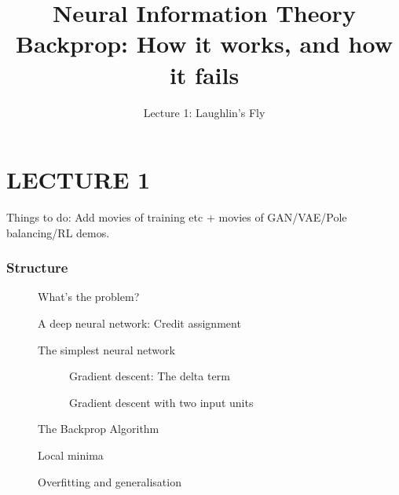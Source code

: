 \documentclass{beamer}
\title[{\em PSY6308}: Information Theory] 
{Neural Information Theory}
\subtitle{Lecture 1: Laughlin's Fly} %
\date{}
\begin{document}


\section{LECTURE 1} %

\title{%
Backprop: How it works, and how it fails}
\subtitle{} %
\setcounter{framenumber}{0}
\begin{frame}
  \maketitle %
   Things to do: Add movies of training etc + movies of GAN/VAE/Pole balancing/RL demos.
\end{frame}

\begin{frame}
  \frametitle{Structure}
 \begin{description}
\item[ ] What's the problem?
\item[] A deep neural network: Credit assignment
\item[] The simplest neural network
 \begin{description}
 	\item[] Gradient descent: The delta term
	\item[] Gradient descent with two input units
\end{description}
\item[] The Backprop Algorithm 
\item[] Local minima
\item[] Overfitting and generalisation
\end{description}
\end{frame}
\end{document}
